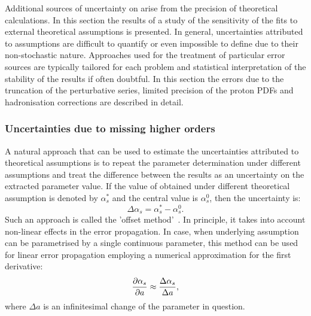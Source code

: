 Additional sources of uncertainty on \as arise from the precision of theoretical calculations. In this section the results of a study of the sensitivity of the \asz fits to external theoretical assumptions is presented. In general, uncertainties attributed to assumptions are difficult to quantify or even impossible to define due to their non-stochastic nature. Approaches used for the treatment of particular error sources are typically tailored for each problem and statistical interpretation of the stability of the results if often doubtful. In this section the errors due to the truncation of the perturbative series, limited precision of the proton PDFs and hadronisation corrections are described in detail.

\subsubsection{Uncertainties due to missing higher orders}
\label{subsec:asscalevar}
A natural approach that can be used to estimate the uncertainties attributed to theoretical assumptions is to repeat the parameter determination under different assumptions and treat the difference between the results as an uncertainty on the extracted parameter value. If the value of \asz obtained under different theoretical assumption is denoted by $\alpha_s^{\ast}$ and the central value is $\alpha_s^0$, then the uncertainty is:
\begin{equation}
 \Delta\alpha_s = \alpha_s^{\ast} - \alpha_s^0.
\end{equation}
Such an approach is called the 'offset method'~\cite{amanda}. In principle, it takes into account non-linear effects in the error propagation. In case, when underlying assumption can be parametrised by a single continuous parameter, this method can be used for linear error propagation employing a numerical approximation for the first derivative:
\begin{equation}
 \frac{\partial \mbox{$\alpha_{s}$}}{ \partial a} \approx \frac{\Delta\alpha_s}{\Delta a},
\end{equation}
where $\Delta a$ is an infinitesimal change of the parameter in question.

